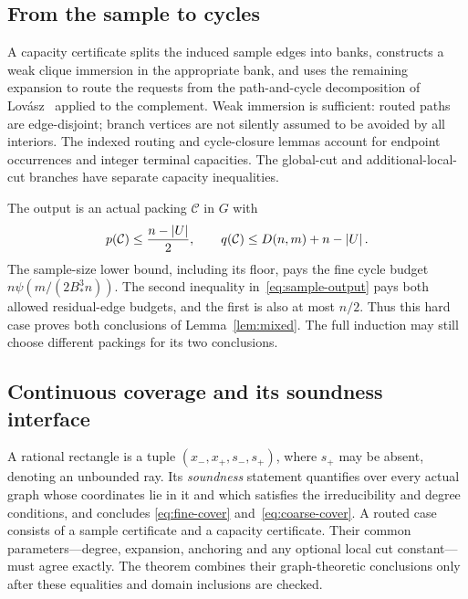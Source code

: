 \subsection{From the sample to cycles}
A capacity certificate splits the induced sample edges into banks, constructs
a weak clique immersion in the appropriate bank, and uses the remaining
expansion to route the requests from the path-and-cycle decomposition of Lov\'asz~\cite{Lovasz1968} applied to the
complement. Weak immersion is sufficient: routed paths are edge-disjoint;
branch vertices are not silently assumed to be avoided by all interiors.
The indexed routing and cycle-closure lemmas account for endpoint occurrences
and integer terminal capacities. The global-cut and additional-local-cut
branches have separate capacity inequalities.

The output is an actual packing $\mathcal C$ in $G$ with
\begin{equation}\label{eq:sample-output}
 p(\mathcal C)\le\frac{n-\left|U\right|}{2},\qquad
 q(\mathcal C)\le D(n,m)+n-\left|U\right|.
\end{equation}
The sample-size lower bound, including its floor, pays the fine cycle budget
$n\psi(m/(2B_*^3n))$. The second inequality in~\eqref{eq:sample-output}
pays both allowed residual-edge budgets, and the first is also at most
$n/2$. Thus this hard case proves both conclusions of
Lemma~\ref{lem:mixed}. The full induction may still choose different
packings for its two conclusions.

\subsection{Continuous coverage and its soundness interface}
A rational rectangle is a tuple $(x_-,x_+,s_-,s_+)$, where $s_+$ may be
absent, denoting an unbounded ray. Its \emph{soundness} statement quantifies
over every actual graph whose coordinates lie in it and which satisfies
the irreducibility and degree conditions, and concludes
\eqref{eq:fine-cover} and~\eqref{eq:coarse-cover}.
A routed case consists of a sample certificate and a capacity certificate.
Their common parameters---degree, expansion, anchoring and any optional
local cut constant---must agree exactly. The theorem
 combines their graph-theoretic conclusions
only after these equalities and domain inclusions are checked.

